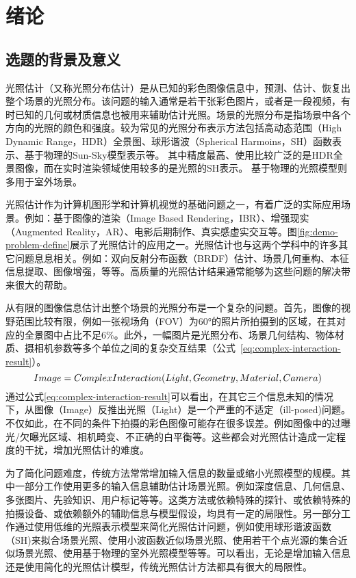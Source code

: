 \chapter{绪论}\label{chap:introduction}

\section{选题的背景及意义}
光照估计（又称光照分布估计）是从已知的彩色图像信息中，预测、估计、恢复出整个场景的光照分布。该问题的输入通常是若干张彩色图片，或者是一段视频，有时已知的几何或材质信息也被用来辅助估计光照。场景的光照分布是指场景中各个方向的光照的颜色和强度。较为常见的光照分布表示方法包括高动态范围（High Dynamic Range，HDR）全景图、球形谐波（Spherical Harmoins，SH）函数表示、基于物理的Sun-Sky模型表示等。
其中精度最高、使用比较广泛的是HDR全景图像，而在实时渲染领域使用较多的是光照的SH表示。 基于物理的光照模型则多用于室外场景。

光照估计作为计算机图形学和计算机视觉的基础问题之一，有着广泛的实际应用场景。例如：基于图像的渲染（Image Based Rendering，IBR）、增强现实（Augmented Reality，AR）、电影后期制作、真实感虚实交互等。图\ref{fig:demo-problem-define}展示了光照估计的应用之一。光照估计也与这两个学科中的许多其它问题息息相关。例如：双向反射分布函数（BRDF）估计、场景几何重构、本征信息提取、图像增强，等等。高质量的光照估计结果通常能够为这些问题的解决带来很大的帮助。 

从有限的图像信息估计出整个场景的光照分布是一个复杂的问题。首先，图像的视野范围比较有限，例如一张视场角（FOV）为60°的照片所拍摄到的区域，在其对应的全景图中占比不足6\%。此外，一幅图片是光照分布、场景几何结构、物体材质、摄相机参数等多个单位之间的复杂交互结果（公式~\ref{eq:complex-interaction-result}）。
\begin{equation} \centering 
    \label{eq:complex-interaction-result}
    Image = ComplexInteraction(Light, Geometry, Material, Camera)
\end{equation}
通过公式\ref{eq:complex-interaction-result}可以看出，在其它三个信息未知的情况下，从图像（Image）反推出光照（Light）是一个严重的不适定（ill-posed)问题。不仅如此，在不同的条件下拍摄的彩色图像可能存在很多误差。例如图像中的过曝光/欠曝光区域、相机畸变、不正确的白平衡等。这些都会对光照估计造成一定程度的干扰，增加光照估计的难度。

为了简化问题难度，传统方法常常增加输入信息的数量或缩小光照模型的规模。其中一部分工作使用更多的输入信息辅助估计场景光照。例如深度信息、几何信息、多张图片、先验知识、用户标记等等。这类方法或依赖特殊的探针、或依赖特殊的拍摄设备、或依赖额外的辅助信息与模型假设，均具有一定的局限性。另一部分工作通过使用低维的光照表示模型来简化光照估计问题，例如使用球形谐波函数（SH)来拟合场景光照、使用小波函数近似场景光照、使用若干个点光源的集合近似场景光照、使用基于物理的室外光照模型等等。可以看出，无论是增加输入信息还是使用简化的光照估计模型，传统光照估计方法都具有很大的局限性。

